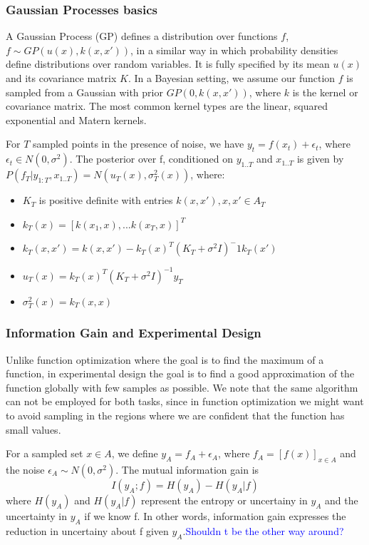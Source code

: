 \documentclass[10pt,journal,a4paper]{IEEEtran}
\begin{document}
\subsubsection{Gaussian Processes basics}
A Gaussian Process (GP) defines a distribution over functions $f$, $f \sim GP(u(x), k(x,x'))$, in a similar way in which probability densities define distributions over random variables. It is fully specified by its mean $u(x)$ and its covariance matrix $K$. In a Bayesian setting, we assume our function $f$ is sampled from a Gaussian with prior $GP(0, k(x,x'))$, where $k$ is the kernel or covariance matrix. The most common kernel types are the linear, squared exponential and Matern kernels.

For $T$ sampled points in the presence of noise, we have $y_t = f(x_t) + \epsilon_t$, where $\epsilon_t \in N(0,\sigma^2)$. The posterior over f, conditioned on $y_{1..T}$ and $x_{1..T}$ is given by
$P(f_T| y_{1:T},x_{1..T}) = N(u_T(x), \sigma_T^2(x))$, where: 
\begin{itemize}
	\item $K_T$ is positive definite with entries $k(x,x'), x,x' \in A_T$   
	\item $k_T(x) = [k(x_1,x),...k(x_T,x)]^T$	
	\item $k_{T}(x,x') = k(x,x') - k_T(x)^T(K_T+\sigma^2I)^-1k_T(x')$
	\item $u_{T}(x) = k_{T}(x)^{T}(K_T + \sigma^2I)^{-1} y_{T}$
	\item $\sigma_T^2(x) =  k_{T}(x,x)$
\end{itemize}

\subsubsection{Information Gain and Experimental Design}

Unlike function optimization where the goal is to find the maximum of a function, in experimental design the goal is to find a good approximation of the function globally with few samples as possible. We note that the same algorithm can not be employed for both tasks, since in function optimization we might want to avoid sampling in the regions where we are confident that the function has small values.

For a sampled set $x\in A$, we define $y_A = f_A + \epsilon_A$, where  $f_A=[f(x)]_{x \in A}$ and the noise $\epsilon_A \sim N(0,\sigma^2)$.
 The mutual information gain is
\begin{equation}
	I(y_A; f) = H(y_A) - H(y_A| f)
\end{equation}
where $H(y_A)$ and $H(y_A|f)$ represent the entropy or uncertainy in $y_A$ and 
the uncertainty in $y_A$ if we know f. In other words, information gain expresses the reduction in uncertainy about f given $y_A$.\textcolor{blue}{Shouldn t be the other way around?}
\end{document}
